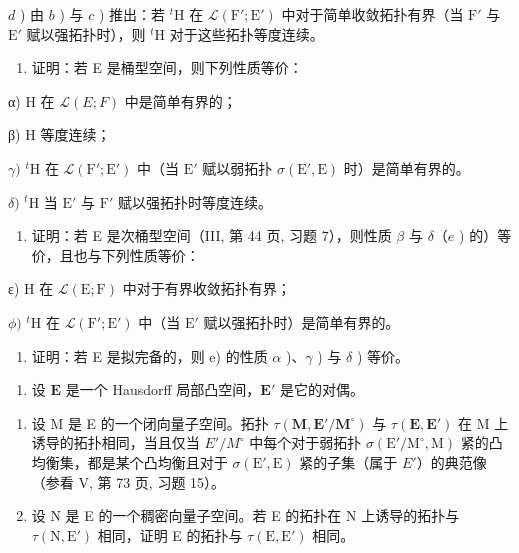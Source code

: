 \(d\) ) 由 \(b\) ) 与 \(c\) ) 推出：若 \({}^t\mathrm{H}\) 在 \(\mathcal{L}(\mathrm{F}';\mathrm{E}')\) 中对于简单收敛拓扑有界（当 \(\mathrm{F}'\) 与 \(\mathrm{E}'\) 赋以强拓扑时），则 \({}^t\mathrm{H}\) 对于这些拓扑等度连续。

\begin{enumerate}
\def\labelenumi{\alph{enumi})}
\setcounter{enumi}{4}
\tightlist
\item
  证明：若 E 是桶型空间，则下列性质等价：
\end{enumerate}

α) H 在 \(\mathcal{L}(E; F)\) 中是简单有界的；

β) H 等度连续；

\(\gamma)\) \({}^{t}\mathrm{H}\) 在 \(\mathcal{L}(\mathrm{F}';\mathrm{E}')\) 中（当 \(\mathrm{E}'\) 赋以弱拓扑 \(\sigma (\mathrm{E}',\mathrm{E})\) 时）是简单有界的。

\(\delta)\) \({}^{t}\mathrm{H}\) 当 \(\mathrm{E}'\) 与 \(\mathrm{F}'\) 赋以强拓扑时等度连续。

\begin{enumerate}
\def\labelenumi{\alph{enumi})}
\setcounter{enumi}{5}
\tightlist
\item
  证明：若 E 是次桶型空间（III, 第 44 页, 习题 7），则性质 \(\beta\) 与 \(\delta\)（\(e\) ) 的）等价，且也与下列性质等价：
\end{enumerate}

ε) H 在 \(\mathcal{L}(\mathrm{E};\mathrm{F})\) 中对于有界收敛拓扑有界；

\(\phi)\) \({}^{t}\mathrm{H}\) 在 \(\mathcal{L}(\mathrm{F}';\mathrm{E}')\) 中（当 \(\mathrm{E}'\) 赋以强拓扑时）是简单有界的。

\begin{enumerate}
\def\labelenumi{\alph{enumi})}
\setcounter{enumi}{6}
\tightlist
\item
  证明：若 E 是拟完备的，则 e) 的性质 \(\alpha\) )、\(\gamma\) ) 与 \(\delta\) ) 等价。
\end{enumerate}

\begin{enumerate}
\def\labelenumi{\arabic{enumi})}
\setcounter{enumi}{19}
\tightlist
\item
  设 \(\mathbf{E}\) 是一个 Hausdorff 局部凸空间，\(\mathbf{E}'\) 是它的对偶。
\end{enumerate}

\begin{enumerate}
\def\labelenumi{\alph{enumi})}
\item
  设 M 是 E 的一个闭向量子空间。拓扑 \(\tau(\mathbf{M}, \mathbf{E}'/\mathbf{M}^{\circ})\) 与 \(\tau(\mathbf{E}, \mathbf{E}')\) 在 M 上诱导的拓扑相同，当且仅当 \(E'/M^{\circ}\) 中每个对于弱拓扑 \(\sigma(\mathrm{E}'/\mathrm{M}^{\circ}, \mathrm{M})\) 紧的凸均衡集，都是某个凸均衡且对于 \(\sigma(\mathrm{E}', \mathrm{E})\) 紧的子集（属于 \(E'\)）的典范像（参看 V, 第 73 页, 习题 15）。
\item
  设 N 是 E 的一个稠密向量子空间。若 E 的拓扑在 N 上诱导的拓扑与 \(\tau(\mathrm{N}, \mathrm{E}')\) 相同，证明 E 的拓扑与 \(\tau(\mathrm{E}, \mathrm{E}')\) 相同。
\end{enumerate}

